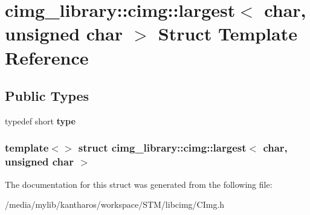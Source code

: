 \hypertarget{structcimg__library_1_1cimg_1_1largest_3_01char_00_01unsigned_01char_01_4}{
\section{cimg\_\-library::cimg::largest$<$ char, unsigned char $>$ Struct Template Reference}
\label{structcimg__library_1_1cimg_1_1largest_3_01char_00_01unsigned_01char_01_4}
}
\subsection*{Public Types}
\begin{DoxyCompactItemize}
\item 
\hypertarget{structcimg__library_1_1cimg_1_1largest_3_01char_00_01unsigned_01char_01_4_aede98033ac1dcde36ec3bf6c317723b7}{
typedef short {\bfseries type}}
\label{structcimg__library_1_1cimg_1_1largest_3_01char_00_01unsigned_01char_01_4_aede98033ac1dcde36ec3bf6c317723b7}

\end{DoxyCompactItemize}
\subsubsection*{template$<$$>$ struct cimg\_\-library::cimg::largest$<$ char, unsigned char $>$}



The documentation for this struct was generated from the following file:\begin{DoxyCompactItemize}
\item 
/media/mylib/kantharos/workspace/STM/libcimg/CImg.h\end{DoxyCompactItemize}
